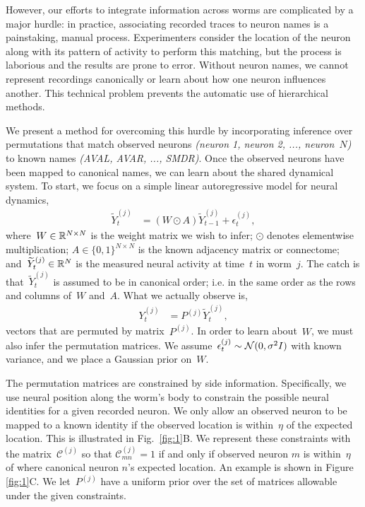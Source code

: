 \documentclass{article}
\begin{document}
However, our efforts to integrate information across worms are
complicated by a major hurdle: in practice, associating recorded
traces to neuron names is a painstaking, manual process.
Experimenters consider the location of the neuron along with its
pattern of activity to perform this matching, but the process is
laborious and the results are prone to error.  Without neuron names,
we cannot represent recordings canonically or learn about how one
neuron influences another. This technical problem prevents the
automatic use of hierarchical methods.

We present a method for overcoming this hurdle by incorporating
inference over permutations that match observed neurons
\textit{(neuron 1, neuron 2, ..., neuron~$N$)} to known names
\textit{(AVAL, AVAR, ..., SMDR)}.  Once the observed neurons have been
mapped to canonical names, we can learn about the shared dynamical
system. To start, we focus on a simple linear autoregressive
model for neural dynamics,
\begin{align}
  \widetilde{Y}_t^{(j)} &= (W \odot A) \widetilde{Y}_{t-1}^{(j)} + \epsilon_t^{(j)},
\end{align}
where~$W \in \mathbb{R}^{N \times N}$ is the weight matrix we wish to infer;
$\odot$ denotes elementwise multiplication;
$A \in \{0,1\}^{N \times N}$ is the known adjacency matrix or connectome; 
and~$\widetilde{Y}_t^{(j)} \in \mathbb{R}^N$ is the measured neural activity
at time~$t$ in worm~$j$.  The catch is that~$\widetilde{Y}_t^{(j)}$ is
assumed to be in canonical order; i.e. in the same order as the rows and
columns of~$W$ and~$A$. What we actually observe is,
\begin{align}
  Y_t^{(j)} &= P^{(j)} \widetilde{Y}_t^{(j)},
\end{align}
vectors that are permuted by matrix~$P^{(j)}$. In order to learn about~$W$,
we must also infer the permutation matrices. We assume~$\epsilon_t^{(j)} \sim \mathcal{N}(0, \sigma^2 I)$ with known variance, and we place a Gaussian prior on~$W$.

The permutation matrices are constrained by side
information. Specifically, we use neural position along the worm's
body to constrain the possible neural identities for a given recorded
neuron. We only allow an observed neuron to be mapped to a known
identity if the observed location is within~$\eta$ of the expected
location.  This is illustrated in Fig.~\ref{fig:1}B. We represent
these constraints with the matrix~$\mathcal{C}^{(j)}$ so that
$\mathcal{C}^{(j)}_{mn}=1$ if and only if observed neuron $m$ is
within~$\eta$ of where canonical neuron $n$'s expected location.  An
example is shown in Figure \ref{fig:1}C. We let~$P^{(j)}$ have a
uniform prior over the set of matrices allowable under the given
constraints.
\end{document}
